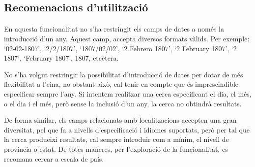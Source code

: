 \subsection{Recomenacions d'utilització}

    \paragraph{}
    En aquesta funcionalitat no s'ha restringit els camps de dates a només la introducció d'un any. Aquest camp, accepta diversos formats vàlids. Per exemple: `02-02-1807', `2/2/1807', `1807/02/02', `2 Febrero 1807', `2 February 1807', `2 1807', `February 1807', 1807, etcètera.

    No s'ha volgut restringir la possibilitat d'introducció de dates per dotar de més flexibilitat a l'eina, no obstant això, cal tenir en compte que és imprescindible especificar sempre l'any. Si intentem realitzar una cerca especificant el dia, el més, o el dia i el més, però sense la inclusió d'un any, la cerca no obtindrà resultats.

    De forma similar, els camps relacionats amb localitzacions accepten una gran diversitat, pel que fa a nivells d'especificació i idiomes suportats, però per tal que la cerca produeixi resultats, cal sempre introduir com a mínim, el nivell de província o estat. De totes maneres, per l'exploració de la funcionalitat, es recomana cercar a escala de país.
